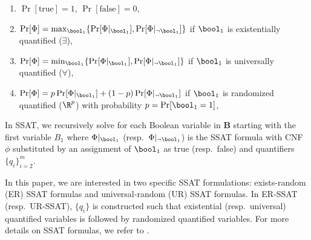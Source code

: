 \begin{enumerate}
	\item $ \Pr[\text{true}] = 1 $,  $ \Pr[\text{false}] = 0 $, 
	\item $ \Pr [\Phi] = \max_{\bool_1} \{\Pr[\Phi|_{\bool_1}], \Pr[\Phi|_{\neg \bool_1}]\}$ if $ \bool_1 $ is existentially quantified ($ \exists $), 
	\item $ \Pr [\Phi] = \min_{\bool_1} \{\Pr[\Phi|_{\bool_1}], \Pr[\Phi|_{\neg \bool_1}]\} $ if $ \bool_1 $ is universally quantified ($ \forall $), 
	\item $ \Pr [\Phi] = p\Pr[\Phi|_{\bool_1}] + (1-p) \Pr[\Phi|_{\neg \bool_1}] $ if $ \bool_1 $ is randomized quantified ($\R^{p}$) with probability $p = \Pr[\bool_1 = 1]$,
\end{enumerate}

In SSAT, we recursively solve for each Boolean variable in $\mathbf{B}$ starting with the first variable $ B_1 $
where $ \Phi|_{\bool_1} $ (resp.\ $ \Phi|_{\neg \bool_1} $) is the SSAT formula with CNF $ \phi $ substituted by an assignment of $ \bool_1 $ as true (resp.\ false) and quantifiers $ \{q_i\}_{i=2}^{m} $. 	

In this paper, we are interested in two specific SSAT formulations: exists-random (ER) SSAT formulas and universal-random (UR) SSAT formulas. In ER-SSAT (resp.\ UR-SSAT), $ \{q_i\} $ is constructed such that  existential (resp.\ universal) quantified variables is followed by randomized quantified variables. For more details on SSAT formulas,  we refer to \cite{ghosh2020justicia,lee2017solving, lee2018solving}.







